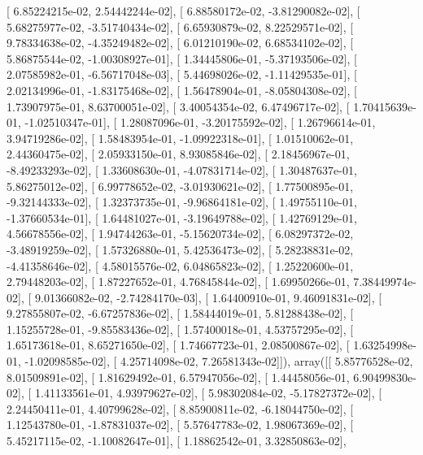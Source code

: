 \documentclass{article}
\begin{document}
       [  6.85224215e-02,   2.54442244e-02],
       [  6.88580172e-02,  -3.81290082e-02],
       [  5.68275977e-02,  -3.51740434e-02],
       [  6.65930879e-02,   8.22529571e-02],
       [  9.78334638e-02,  -4.35249482e-02],
       [  6.01210190e-02,   6.68534102e-02],
       [  5.86875544e-02,  -1.00308927e-01],
       [  1.34445806e-01,  -5.37193506e-02],
       [  2.07585982e-01,  -6.56717048e-03],
       [  5.44698026e-02,  -1.11429535e-01],
       [  2.02134996e-01,  -1.83175468e-02],
       [  1.56478904e-01,  -8.05804308e-02],
       [  1.73907975e-01,   8.63700051e-02],
       [  3.40054354e-02,   6.47496717e-02],
       [  1.70415639e-01,  -1.02510347e-01],
       [  1.28087096e-01,  -3.20175592e-02],
       [  1.26796614e-01,   3.94719286e-02],
       [  1.58483954e-01,  -1.09922318e-01],
       [  1.01510062e-01,   2.44360475e-02],
       [  2.05933150e-01,   8.93085846e-02],
       [  2.18456967e-01,  -8.49233293e-02],
       [  1.33608630e-01,  -4.07831714e-02],
       [  1.30487637e-01,   5.86275012e-02],
       [  6.99778652e-02,  -3.01930621e-02],
       [  1.77500895e-01,  -9.32144333e-02],
       [  1.32373735e-01,  -9.96864181e-02],
       [  1.49755110e-01,  -1.37660534e-01],
       [  1.64481027e-01,  -3.19649788e-02],
       [  1.42769129e-01,   4.56678556e-02],
       [  1.94744263e-01,  -5.15620734e-02],
       [  6.08297372e-02,  -3.48919259e-02],
       [  1.57326880e-01,   5.42536473e-02],
       [  5.28238831e-02,  -4.41358646e-02],
       [  4.58015576e-02,   6.04865823e-02],
       [  1.25220600e-01,   2.79448203e-02],
       [  1.87227652e-01,   4.76845844e-02],
       [  1.69950266e-01,   7.38449974e-02],
       [  9.01366082e-02,  -2.74284170e-03],
       [  1.64400910e-01,   9.46091831e-02],
       [  9.27855807e-02,  -6.67257836e-02],
       [  1.58444019e-01,   5.81288438e-02],
       [  1.15255728e-01,  -9.85583436e-02],
       [  1.57400018e-01,   4.53757295e-02],
       [  1.65173618e-01,   8.65271650e-02],
       [  1.74667723e-01,   2.08500867e-02],
       [  1.63254998e-01,  -1.02098585e-02],
       [  4.25714098e-02,   7.26581343e-02]]), array([[  5.85776528e-02,   8.01509891e-02],
       [  1.81629492e-01,   6.57947056e-02],
       [  1.44458056e-01,   6.90499830e-02],
       [  1.41133561e-01,   4.93979627e-02],
       [  5.98302084e-02,  -5.17827372e-02],
       [  2.24450411e-01,   4.40799628e-02],
       [  8.85900811e-02,  -6.18044750e-02],
       [  1.12543780e-01,  -1.87831037e-02],
       [  5.57647783e-02,   1.98067369e-02],
       [  5.45217115e-02,  -1.10082647e-01],
       [  1.18862542e-01,   3.32850863e-02],
\end{document}
